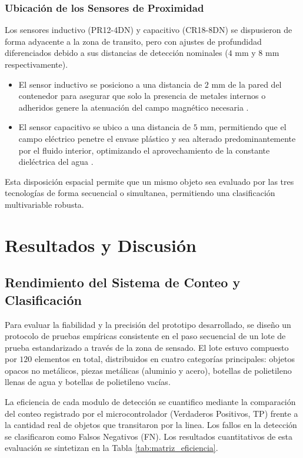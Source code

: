 \documentclass[conference]{IEEEtran}
\begin{document}
\subsubsection{Ubicación de los Sensores de Proximidad}
Los sensores inductivo (PR12-4DN) y capacitivo (CR18-8DN) se dispusieron de forma adyacente a la zona de transito, pero con ajustes de profundidad diferenciados debido a sus distancias de detección nominales ($4$ mm y $8$ mm respectivamente). 
\begin{itemize}
    \item El sensor inductivo se posiciono a una distancia de $2$ mm de la pared del contenedor para asegurar que solo la presencia de metales internos o adheridos genere la atenuación del campo magnético necesaria \cite{sensores_5}.
    \item El sensor capacitivo se ubico a una distancia de $5$ mm, permitiendo que el campo eléctrico penetre el envase plástico y sea alterado predominantemente por el fluido interior, optimizando el aprovechamiento de la constante dieléctrica del agua \cite{sensores_16}.
\end{itemize}
Esta disposición espacial permite que un mismo objeto sea evaluado por las tres tecnologías de forma secuencial o simultanea, permitiendo una clasificación multivariable robusta.

\section{Resultados y Discusión}

\subsection{Rendimiento del Sistema de Conteo y Clasificación}

Para evaluar la fiabilidad y la precisión del prototipo desarrollado, se diseño un protocolo de pruebas empíricas consistente en el paso secuencial de un lote de prueba estandarizado a través de la zona de sensado. El lote estuvo compuesto por $120$ elementos en total, distribuidos en cuatro categorías principales: objetos opacos no metálicos, piezas metálicas (aluminio y acero), botellas de polietileno llenas de agua y botellas de polietileno vacías. 

La eficiencia de cada modulo de detección se cuantifico mediante la comparación del conteo registrado por el microcontrolador (Verdaderos Positivos, TP) frente a la cantidad real de objetos que transitaron por la linea. Los fallos en la detección se clasificaron como Falsos Negativos (FN). Los resultados cuantitativos de esta evaluación se sintetizan en la Tabla \ref{tab:matriz_eficiencia}.
\end{document}
